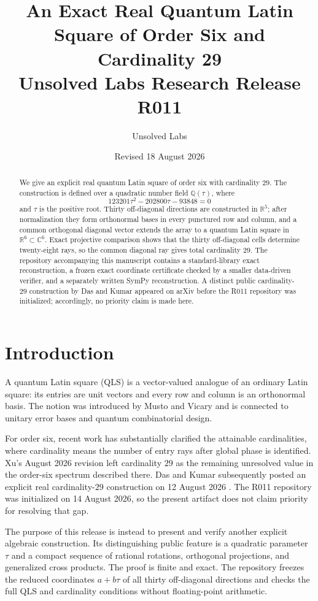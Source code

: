 \documentclass[11pt]{article}
\title{An Exact Real Quantum Latin Square of Order Six and Cardinality 29\\
\large Unsolved Labs Research Release R011}
\author{Unsolved Labs}
\date{Revised 18 August 2026}
\theoremstyle{definition}
\theoremstyle{plain}
\newcommand{\R}{\mathbb{R}}
\newcommand{\C}{\mathbb{C}}
\newcommand{\Q}{\mathbb{Q}}
\begin{document}
\maketitle

\begin{abstract}
We give an explicit real quantum Latin square of order six with cardinality \(29\).
The construction is defined over a quadratic number field
\(\Q(\tau)\), where
\[
123201\tau^2-202800\tau-93848=0
\]
and \(\tau\) is the positive root.
Thirty off-diagonal directions are constructed in \(\R^5\); after normalization they form orthonormal bases in every punctured row and column, and a common orthogonal diagonal vector extends the array to a quantum Latin square in \(\R^6\subset\C^6\).
Exact projective comparison shows that the thirty off-diagonal cells determine twenty-eight rays, so the common diagonal ray gives total cardinality \(29\).
The repository accompanying this manuscript contains a standard-library exact reconstruction, a frozen exact coordinate certificate checked by a smaller data-driven verifier, and a separately written SymPy reconstruction.
A distinct public cardinality-\(29\) construction by Das and Kumar appeared on arXiv before the R011 repository was initialized; accordingly, no priority claim is made here.
\end{abstract}

\section{Introduction}

A quantum Latin square (QLS) is a vector-valued analogue of an ordinary Latin square: its entries are unit vectors and every row and column is an orthonormal basis.
The notion was introduced by Musto and Vicary \cite{MustoVicary2016} and is connected to unitary error bases and quantum combinatorial design.

For order six, recent work has substantially clarified the attainable cardinalities, where cardinality means the number of entry rays after global phase is identified.
Xu's August 2026 revision \cite{Xu2026} left cardinality \(29\) as the remaining unresolved value in the order-six spectrum described there.
Das and Kumar subsequently posted an explicit real cardinality-\(29\) construction on 12 August 2026 \cite{DasKumar2026}.
The R011 repository was initialized on 14 August 2026, so the present artifact does not claim priority for resolving that gap.

The purpose of this release is instead to present and verify another explicit algebraic construction.
Its distinguishing public feature is a quadratic parameter \(\tau\) and a compact sequence of rational rotations, orthogonal projections, and generalized cross products.
The proof is finite and exact.
The repository freezes the reduced coordinates \(a+b\tau\) of all thirty off-diagonal directions and checks the full QLS and cardinality conditions without floating-point arithmetic.
\end{document}
